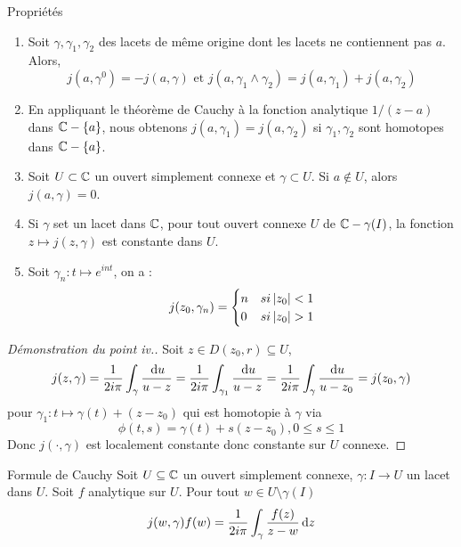 \documentclass{cours}
\begin{document}
\begin{propositionfr}{Propriétés}{}
    \begin{enumerate}
        \item Soit $\gamma, \gamma_{1}, \gamma_{2}$ des lacets de même origine dont les lacets ne contiennent pas $a$. Alors,
        \[
            j(a, \gamma^{0}) = -j(a, \gamma) \text{ et } j(a, \gamma_{1} \land \gamma_{2}) = j(a, \gamma_{1}) + j(a, \gamma_{2})
        \]
        \item En appliquant le théorème de Cauchy à la fonction analytique $1/(z - a)$ dans $\mathbb{C} - \{a\}$, nous obtenons $j(a, \gamma_{1}) = j(a, \gamma_{2})$ si $\gamma_{1}, \gamma_{2}$ sont homotopes dans $\mathbb{C} - \{a\}$.
        \item Soit $U \subset \mathbb{C}$ un ouvert simplement connexe et $\gamma \subset U$. Si $a \notin U$, alors $j(a, \gamma) = 0$.
        \item Si $\gamma$ set un lacet dans $\mathbb{C}$, pour tout ouvert connexe $U$ de $\mathbb{C} - \gamma(I)$, la fonction $z \mapsto j(z, \gamma)$ est constante dans $U$.
        \item Soit $\gamma_{n} : t \mapsto e^{int}$, on a : 
        \[
            j(z_{0}, \gamma_{n}) = \begin{cases}
                n & si \left|z_{0}\right| < 1\\
                0 & si \left|z_{0}\right| > 1
            \end{cases}
        \]
    \end{enumerate}
\end{propositionfr}
\begin{proof}[Démonstration du point iv.]
    Soit $z \in D(z_{0}, r) \subseteq U$, 
    \[
        j(z, \gamma) = \frac{1}{2i\pi}\int_{\gamma}\frac{{\rm \, d} u}{u - z} = \frac{1}{2i\pi}\int_{\gamma_{1}}\frac{{\rm \, d} u}{u - z} = \frac{1}{2i\pi}\int_{\gamma}\frac{{\rm \, d} u}{u - z_{0}} = j(z_{0}, \gamma)
    \]
    pour $\gamma_{1} : t \mapsto \gamma(t) + (z - z_{0})$ qui est homotopie à $\gamma$ via 
    \[
        \phi(t, s) = \gamma(t) + s(z - z_{0}), 0 \leq s \leq 1
    \]
    Donc $j(\cdot, \gamma)$ est localement constante donc constante sur $U$ connexe. 
\end{proof}

\begin{théorème}{Formule de Cauchy}{}
    Soit $U \subseteq \mathbb{C}$ un ouvert simplement connexe, $\gamma : I \to U$ un lacet dans $U$. Soit $f$ analytique sur $U$. Pour tout $w \in U \setminus \gamma(I)$
    \[
        j(w, \gamma)f(w) = \frac{1}{2i\pi}\int_{\gamma}\frac{f(z)}{z - w}{\rm \, d} z
    \]
\end{théorème}
\end{document}
